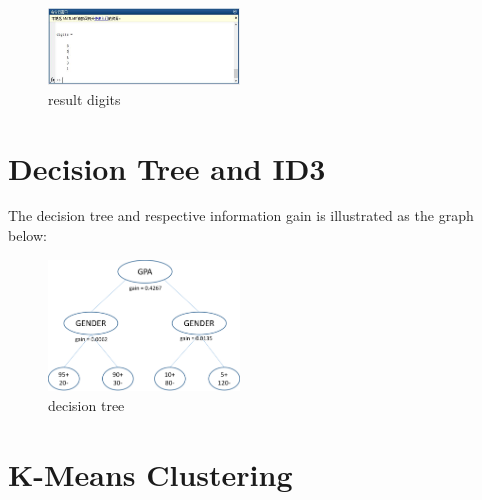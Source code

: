\documentclass[11pt]{article} %
\begin{document}
\begin{figure}
\centering
\includegraphics[width=2in]{knn_resultdigits.jpg}  %
\caption{result digits}
\label{fig6}
\end{figure}


\section{Decision Tree and ID3}
The decision tree and respective information gain is illustrated as the graph below:

\begin{figure}[h]
\centering
\includegraphics[width=2in]{tree.png}  %
\caption{decision tree}
\label{fig4}
\end{figure}

\section{K-Means Clustering}
\end{document}
